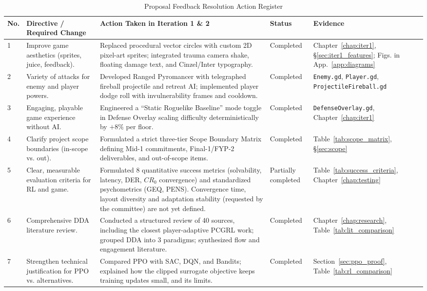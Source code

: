 \begin{table}[!htbp]
\centering
\caption{Proposal Feedback Resolution Action Register}
\label{tab:action_register}
\scriptsize
\begin{tabular}{p{}p{}p{}p{}p{}}
\toprule
\textbf{No.} & \textbf{Directive / Required Change} & \textbf{Action Taken in Iteration 1 \& 2} & \textbf{Status} & \textbf{Evidence} \\
\midrule
1 & Improve game aesthetics (sprites, juice, feedback). & Replaced procedural vector circles with custom 2D pixel-art sprites; integrated trauma camera shake, floating damage text, and Cinzel/Inter typography. & Completed & Chapter~\ref{chap:iter1}, §\ref{sec:iter1_features}; Figs. in App.~\ref{app:diagrams} \\
\midrule
2 & Variety of attacks for enemy and player powers. & Developed Ranged Pyromancer with telegraphed fireball projectile and retreat AI; implemented player dodge roll with invulnerability frames and cooldown. & Completed & \texttt{Enemy.gd}, \texttt{Player.gd}, \texttt{ProjectileFireball.gd} \\
\midrule
3 & Engaging, playable game experience without AI. & Engineered a ``Static Roguelike Baseline'' mode toggle in Defense Overlay scaling difficulty deterministically by $+8\%$ per floor. & Completed & \texttt{DefenseOverlay.gd}, Chapter~\ref{chap:iter1} \\
\midrule
4 & Clarify project scope boundaries (in-scope vs. out). & Formulated a strict three-tier Scope Boundary Matrix defining Mid-1 commitments, Final-1/FYP-2 deliverables, and out-of-scope items. & Completed & Table~\ref{tab:scope_matrix}, §\ref{sec:scope} \\
\midrule
5 & Clear, measurable evaluation criteria for RL and game. & Formulated 8 quantitative success metrics (solvability, latency, DER, $CR_0$ convergence) and standardized psychometrics (GEQ, PENS). Convergence time, layout diversity and adaptation stability (requested by the committee) are not yet defined. & Partially completed & Table~\ref{tab:success_criteria}, Chapter~\ref{chap:testing} \\
\midrule
6 & Comprehensive DDA literature review. & Conducted a structured review of 40 sources, including the closest player-adaptive PCGRL work; grouped DDA into 3 paradigms; synthesized flow and engagement literature. & Completed & Chapter~\ref{chap:research}, Table~\ref{tab:lit_comparison} \\
\midrule
7 & Strengthen technical justification for PPO vs. alternatives. & Compared PPO with SAC, DQN, and Bandits; explained how the clipped surrogate objective keeps training updates small, and its limits. & Completed & Section~\ref{sec:ppo_proof}, Table~\ref{tab:rl_comparison} \\

\end{tabular}
\end{table}
